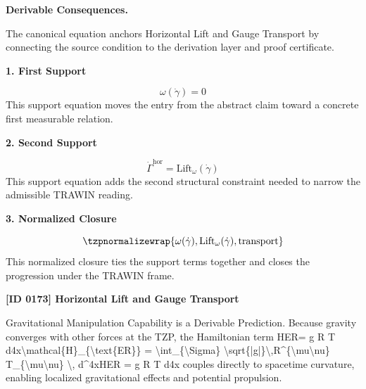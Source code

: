 \par\vspace{0.35em}
\noindent\textbf{Derivable Consequences.}\quad
\begingroup
\footnotesize
\raggedright
The canonical equation anchors Horizontal Lift and Gauge Transport by connecting the source condition to the derivation layer and proof certificate.
\par\endgroup

\noindent\textbf{1. First Support}\par
\[
\omega(\dot\gamma)=0
\]
\noindent This support equation moves the entry from the abstract claim toward a concrete first measurable relation.\par
\noindent\textbf{2. Second Support}\par
\[
\dot\Gamma^{\mathrm{hor}} = \mathrm{Lift}_{\omega}(\dot\gamma)
\]
\noindent This support equation adds the second structural constraint needed to narrow the admissible TRAWIN reading.\par
\noindent\textbf{3. Normalized Closure}\par
\[
\tzpnormalizewrap{\omega(\dot\gamma),\mathrm{Lift}_{\omega}(\dot\gamma),\text{transport}}
\]
\noindent This normalized closure ties the support terms together and closes the progression under the TRAWIN frame.\par

\clearpage
\noindent\textbf{[ID 0173] Horizontal Lift and Gauge Transport}\par
\vspace{0.35em}
\begingroup\small
{}
Gravitational Manipulation Capability is a Derivable Prediction. Because gravity converges with other forces at the TZP, the Hamiltonian term HER=   g  R  T   d4x\textbackslash{}mathcal\{H\}\_\{\textbackslash{}text\{ER\}\} = \textbackslash{}int\_\{\textbackslash{}Sigma\} \textbackslash{}sqrt\{|g|\}\textbackslash{},R\textasciicircum{}\{\textbackslash{}mu\textbackslash{}nu\} T\_\{\textbackslash{}mu\textbackslash{}nu\} \textbackslash{}, d\textasciicircum{}4xHER =    g  R  T   d4x couples directly to spacetime curvature, enabling localized gravitational effects and potential propulsion.

